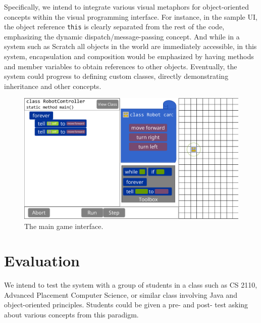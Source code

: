 \documentclass[12pt,notitlepage]{article}
\begin{document}
Specifically, we intend to integrate various visual metaphors for
object-oriented concepts within the visual programming interface. For
instance, in the sample UI, the object reference \texttt{this} is
clearly separated from the rest of the code, emphasizing the dynamic
dispatch/message-passing concept. And while in a system such as
Scratch all objects in the world are immediately accessible, in this
system, encapsulation and composition would be emphasized by having
methods and member variables to obtain references to other
objects. Eventually, the system could progress to defining custom
classes, directly demonstrating inheritance and other concepts.

\begin{figure}[h]
  \centering
  \includegraphics[width=\textwidth]{mockup.pdf}
  \caption{The main game interface.}
\end{figure}

\section{Evaluation}

We intend to test the system with a group of students in a class such
as CS 2110, Advanced Placement Computer Science, or similar class
involving Java and object-oriented principles. Students could be given
a pre- and post- test asking about various concepts from this paradigm.
\end{document}
